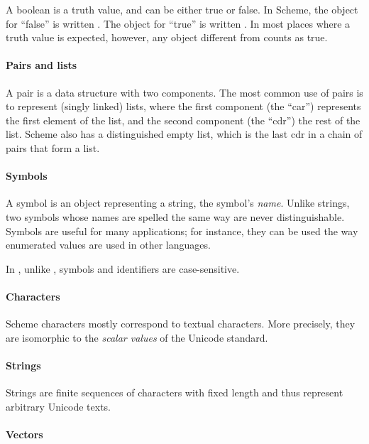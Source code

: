 A boolean is a truth value, and can be either
true or false.  In Scheme, the object for ``false'' is written
\schfalse{}.  The object for ``true'' is written \schtrue{}.  In
most places where a truth value is expected, however, any object different from
\schfalse{} counts as true.

\paragraph{Pairs and lists}

A pair is a data structure with two components.  The most common use
of pairs is to represent (singly linked) lists, where the first
component (the ``car'') represents the first element of the list, and
the second component (the ``cdr'') the rest of the list.  Scheme also
has a distinguished empty list, which is the last cdr in a chain of
pairs that form a list.

\paragraph{Symbols}

A symbol is an object representing a string,
the symbol's \textit{name}.
Unlike strings, two symbols whose names are spelled the same
way are never distinguishable.  Symbols are useful for many applications;
for instance, they can be used the way enumerated values are used in
other languages.

In \rsevenrs, unlike \rfivers, symbols and identifiers are case-sensitive.

\paragraph{Characters}

Scheme characters mostly correspond to textual characters.
More precisely, they are isomorphic to the \textit{scalar values} of
the Unicode standard.

\paragraph{Strings}

Strings are finite sequences of characters with fixed length and thus
represent arbitrary Unicode texts.

\paragraph{Vectors}

